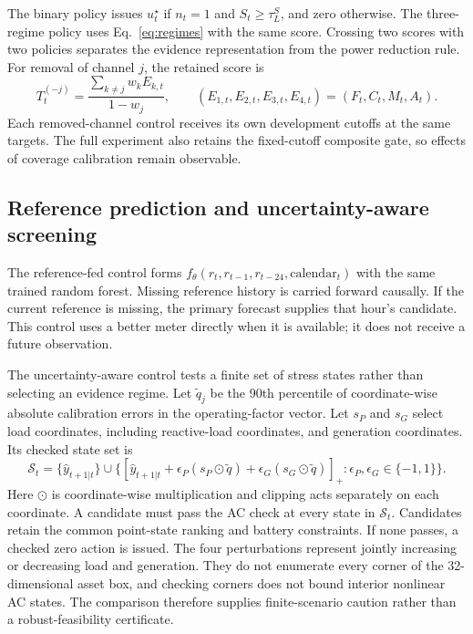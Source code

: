 \documentclass[preprint,12pt]{elsarticle}
\begin{document}
The binary policy issues $u_t^\star$ if $n_t=1$ and $S_t\geq\tau_L^S$, and zero otherwise. The three-regime policy uses Eq.~\eqref{eq:regimes} with the same score. Crossing two scores with two policies separates the evidence representation from the power reduction rule. For removal of channel $j$, the retained score is
\begin{equation}
T_t^{(-j)}=\frac{\sum_{k\ne j}w_k E_{k,t}}{1-w_j},\qquad
(E_{1,t},E_{2,t},E_{3,t},E_{4,t})=(F_t,C_t,M_t,A_t).
\label{eq:ablation}
\end{equation}
Each removed-channel control receives its own development cutoffs at the same targets. The full experiment also retains the fixed-cutoff composite gate, so effects of coverage calibration remain observable.

\subsection{Reference prediction and uncertainty-aware screening}
The reference-fed control forms $f_\theta(r_t,r_{t-1},r_{t-24},\mathrm{calendar}_t)$ with the same trained random forest. Missing reference history is carried forward causally. If the current reference is missing, the primary forecast supplies that hour's candidate. This control uses a better meter directly when it is available; it does not receive a future observation.

The uncertainty-aware control tests a finite set of stress states rather than selecting an evidence regime. Let $\widetilde q_j$ be the 90th percentile of coordinate-wise absolute calibration errors in the operating-factor vector. Let $s_P$ and $s_G$ select load coordinates, including reactive-load coordinates, and generation coordinates. Its checked state set is
\begin{equation}
\mathcal S_t=\{\widehat y_{t+1|t}\}\cup
\{[\widehat y_{t+1|t}+\epsilon_P(s_P\odot\widetilde q)
+\epsilon_G(s_G\odot\widetilde q)]_+:
\epsilon_P,\epsilon_G\in\{-1,1\}\}.
\label{eq:stressstates}
\end{equation}
Here $\odot$ is coordinate-wise multiplication and clipping acts separately on each coordinate. A candidate must pass the AC check at every state in $\mathcal S_t$. Candidates retain the common point-state ranking and battery constraints. If none passes, a checked zero action is issued. The four perturbations represent jointly increasing or decreasing load and generation. They do not enumerate every corner of the 32-dimensional asset box, and checking corners does not bound interior nonlinear AC states. The comparison therefore supplies finite-scenario caution rather than a robust-feasibility certificate.
\end{document}
